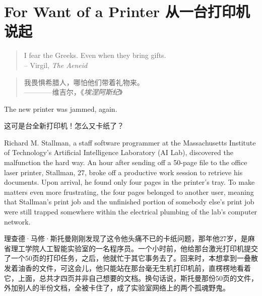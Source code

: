 \chapter{\ifdefined\eng
For Want of a Printer
\fi
\ifdefined\chs
从一台打印机说起
\fi
}

\ifdefined\eng
\begin{quotation}
  \begin{flushright}
    I fear the Greeks. Even when they bring gifts.\\
    -- Virgil, \textit{The Aeneid}
  \end{flushright}
\end{quotation}
\fi

\ifdefined\chs
\begin{quotation}
  \begin{flushright}
   我畏惧希腊人，哪怕他们带着礼物来。\\
    ————维吉尔，《\textit{埃涅阿斯纪}》
  \end{flushright}
\end{quotation}
\fi

\ifdefined\eng
The new printer was jammed, again.
\fi

\ifdefined\chs
这可是台全新打印机！怎么又卡纸了？
\fi

\ifdefined\eng
Richard M. Stallman, a staff software programmer at the Massachusetts Institute of Technology's Artificial Intelligence Laboratory (AI Lab), discovered the malfunction the hard way. An hour after sending off a 50-page file to the office laser printer, Stallman, 27, broke off a productive work session to retrieve his documents. Upon arrival, he found only four pages in the printer's tray. To make matters even more frustrating, the four pages belonged to another user, meaning that Stallman's print job and the unfinished portion of somebody else's print job were still trapped somewhere within the electrical plumbing of the lab's computer network.
\fi

\ifdefined\chs
理查德·马修·斯托曼刚刚发现了这令他头痛不已的卡纸问题，那年他27岁，是麻省理工学院人工智能实验室的一名程序员。一个小时前，他给那台激光打印机提交了一个50页的打印任务，之后，他就忙于其它事务去了。回来时，本想拿到一叠散发着油香的文件，可这会儿，他只能站在那台毫无生机打印机前，直楞楞地看着它，上面，总共才四页并非自己想要的文档。换句话说，斯托曼那份50页的文件，外加别人的半份文档，全被卡住了，成了实验室网络上的两个孤魂野鬼。
\fi


